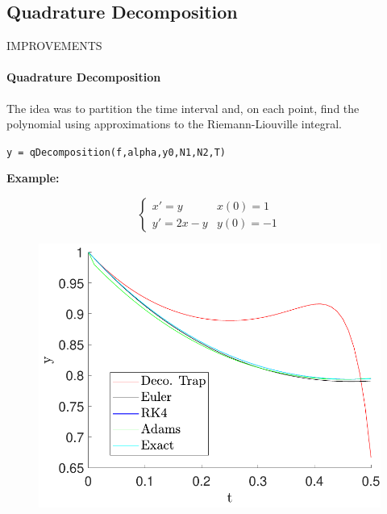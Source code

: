 \subsection{Quadrature Decomposition}
\begin{frame}{IMPROVEMENTS}
\framesubtitle{Quadrature Decomposition}
The idea was to partition the time interval and, on each point, find the polynomial using approximations to the Riemann-Liouville integral.\\[0.4cm]
\begin{center}
    \texttt{y = qDecomposition(f,alpha,y0,N1,N2,T)}
\end{center}
\textbf{Example:}\\[0.4cm]
\begin{multicols}{2}
\begin{equation}
    \begin{cases}
        x'=y&x(0)=1\\
        y'=2x-y&y(0)=-1
    \end{cases}
\end{equation}
\columnbreak
\begin{figure}[H]
    \centering
    \includegraphics[scale=0.4]{files/mejoras/decom_trap.pdf}
\end{figure}
\end{multicols}
\end{frame}



